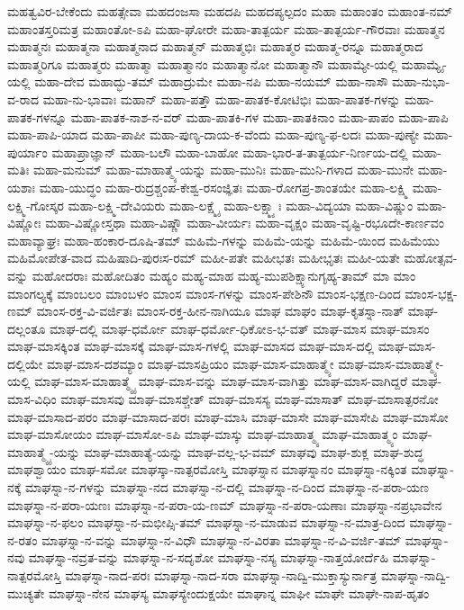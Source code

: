 {ಮಹತ್ವವಿರ-ಬೇಕೆಂದು
ಮಹತ್ಸೇವಾ
ಮಹದಂಜಸಾ
ಮಹದಪಿ
ಮಹದಪ್ಯಲ್ಪದಂ
ಮಹಾ
ಮಹಾಂತಂ
ಮಹಾಂತ-ನಮ್
ಮಹಾಂತಸ್ತರಿಮತ್ರ
ಮಹಾಂತೋ-ಽಪಿ
ಮಹಾ-ಘೋರೇ
ಮಹಾ-ತಾತ್ಪರ್ಯ
ಮಹಾ-ತಾತ್ಪರ್ಯ-ಗೌರವಾಃ
ಮಹಾತ್ಮನ
ಮಹಾತ್ಮನಃ
ಮಹಾತ್ಮನಾ
ಮಹಾತ್ಮನಾದ
ಮಹಾತ್ಮನ್
ಮಹಾತ್ಮಭಿಃ
ಮಹಾತ್ಮರ
ಮಹಾತ್ಮ-ರನ್ನೂ
ಮಹಾತ್ಮರಾದ
ಮಹಾತ್ಮರಿಗೂ
ಮಹಾತ್ಮರು
ಮಹಾತ್ಮಾ
ಮಹಾತ್ಮಾನಂ
ಮಹಾತ್ಮಾನೋ
ಮಹಾತ್ಮಾನೌ
ಮಹಾಮ್ಯೇ-ಯಲ್ಲಿ
ಮಹಾಮ್ಯೈ-ಯಲ್ಲಿ
ಮಹಾ-ದೇವ
ಮಹಾದ್ಭು-ತಮ್
ಮಹಾದ್ರುಮೇ
ಮಹಾ-ನಪಿ
ಮಹಾ-ನಯಮ್
ಮಹಾ-ನಾಸೌ
ಮಹಾ-ನುಭಾ-ವ-ರಾದ
ಮಹಾ-ನು-ಭಾವಾಃ
ಮಹಾನ್
ಮಹಾ-ಪತ್ತೌ
ಮಹಾ-ಪಾತಕ-ಕೋಟಿಭಿಃ
ಮಹಾ-ಪಾತಕ-ಗಳನ್ನು
ಮಹಾ-ಪಾತಕ-ಗಳನ್ನೂ
ಮಹಾ-ಪಾತಕ-ನಾಶ-ನ-ವರ್
ಮಹಾ-ಪಾತಕಿ-ಗಳ
ಮಹಾ-ಪಾತಕಿನಾಂ
ಮಹಾ-ಪಾಪಂ
ಮಹಾ-ಪಾಪಿ
ಮಹಾ-ಪಾಪಿ-ಯಾದ
ಮಹಾ-ಪಾಪೀ
ಮಹಾ-ಪುಣ್ಯ-ದಾಯ-ಕ-ವೆಂದು
ಮಹಾ-ಪುಣ್ಯ-ಫ-ಲದಃ
ಮಹಾ-ಪುಣ್ಯೇ
ಮಹಾ-ಪುರ್ಯಾಂ
ಮಹಾಪ್ರಾಜ್ಞಾನ್
ಮಹಾ-ಬಲೌ
ಮಹಾ-ಬಾಹೋ
ಮಹಾ-ಭಾರ-ತ-ತಾತ್ಪರ್ಯ-ನಿರ್ಣಯ-ದಲ್ಲಿ
ಮಹಾ-ಮತಿಃ
ಮಹಾ-ಮನುಮ್
ಮಹಾ-ಮಾಹಾತ್ಮ್ಯೆ-ಯನ್ನು
ಮಹಾ-ಮುನಿಃ
ಮಹಾ-ಮುನಿ-ಗಳಾದ
ಮಹಾ-ಮುನೇ
ಮಹಾ-ಯಶಾಃ
ಮಹಾ-ಯುದ್ಧಂ
ಮಹಾ-ರುದ್ರಶ್ಚಂಪ-ಕೇಶ್ವ-ರಸಂಜ್ಞಿತಃ
ಮಹಾ-ರೋಗಪ್ರ-ಶಾಂತಯೇ
ಮಹಾ-ಲಕ್ಷ್ಮಿ
ಮಹಾ-ಲಕ್ಷ್ಮಿ-ಗೋಸ್ಕರ
ಮಹಾ-ಲಕ್ಷ್ಮಿ-ದೇವಿಯರು
ಮಹಾ-ಲಕ್ಷ್ಮೈ
ಮಹಾ-ಲಕ್ಷ್ಮ್ಯಾಃ
ಮಹಾ-ವಿದ್ಯಯಾ
ಮಹಾ-ವಿಷ್ಣುಂ
ಮಹಾ-ವಿಷ್ಣೋಃ
ಮಹಾ-ವಿಷ್ಣೋಸ್ತಥಾ
ಮಹಾ-ವಿಷ್ಣೌ
ಮಹಾ-ವೀರ್ಯಃ
ಮಹಾ-ವೃಕ್ಷಂ
ಮಹಾ-ವೃಷ್ಟಿ-ರಭೂದೇ-ಕಾರ್ಣವಂ
ಮಹಾವ್ಯಾಘ್ರಃ
ಮಹಾ-ಹಂಕಾರ-ದೂಷಿ-ತಮ್
ಮಹಿಮೆ-ಗಳನ್ನು
ಮಹಿಮೆ-ಯನ್ನು
ಮಹಿಮೆ-ಯಿಂದ
ಮಹಿಮೆಯು
ಮಹಿಮೋಪೇತ-ವಾದ
ಮಹಿಷಾದಿ-ಪುರಃಸ-ರಮ್
ಮಹೀ-ಪತೇ
ಮಹೀಭತಃ
ಮಹೀಭೃತಃ
ಮಹೀ-ಯತೇ
ಮಹೋತ್ಸವ-ವನ್ನು
ಮಹೋದರಾಃ
ಮಹೋದಿತಂ
ಮಹ್ಯಂ
ಮಹ್ಯ-ಮಾಹ
ಮಹ್ಯ-ಮುಪಶಿಕ್ಷ್ಯಾನುಗೃಹ್ಯ-ತಾಮ್
ಮಾ
ಮಾಂ
ಮಾಂಗಲ್ಯಕ್ಕೆ
ಮಾಂಬಲಂ
ಮಾಂಬಳಂ
ಮಾಂಸ
ಮಾಂಸ-ಗಳನ್ನು
ಮಾಂಸ-ಪೇಶಿನೌ
ಮಾಂಸ-ಭಕ್ಷಣ-ದಿಂದ
ಮಾಂಸ-ಭಕ್ಷ-ಣಮ್
ಮಾಂಸ-ರಕ್ತ-ವಿ-ವರ್ಜಿತಃ
ಮಾಂಸ-ರಕ್ತ-ಹೀನ-ನಾಗಿಯೂ
ಮಾಘ
ಮಾಘಂ
ಮಾಘ-ಕೃತಸ್ನಾ-ನಾತ್
ಮಾಘ-ದಲ್ಲಂತೂ
ಮಾಘ-ದಲ್ಲಿ
ಮಾಘ-ಧರ್ಮೋ
ಮಾಘ-ಧರ್ಮೋ-ಧಿಕೋಽ-ಭ-ವತ್
ಮಾಘ-ಮಾಸ
ಮಾಘ-ಮಾಸಂ
ಮಾಘ-ಮಾಸಕ್ಕಿಂತ
ಮಾಘ-ಮಾಸಕ್ಕೆ
ಮಾಘ-ಮಾಸ-ಗಳಲ್ಲಿ
ಮಾಘ-ಮಾಸದ
ಮಾಘ-ಮಾಸ-ದಲ್ಲಿ
ಮಾಘ-ಮಾಸ-ದಲ್ಲಿಯೇ
ಮಾಘ-ಮಾಸ-ದಶಮ್ಯಾಂ
ಮಾಘ-ಮಾಸಪ್ರಿಯಂ
ಮಾಘ-ಮಾಸ-ಮಾಹಾತ್ಮ್ಯೇ
ಮಾಘ-ಮಾಸ-ಮಾಹಾತ್ಮ್ಯೇ-ಯಲ್ಲಿ
ಮಾಘ-ಮಾಸ-ಮಾಹಾತ್ಮ್ಯೈ
ಮಾಘ-ಮಾಸ-ವನ್ನು
ಮಾಘ-ಮಾಸ-ವಾಗಿತ್ತು
ಮಾಘ-ಮಾಸ-ವಾಗಿದ್ದರೆ
ಮಾಘ-ಮಾಸ-ವಿಧಿಂ
ಮಾಘ-ಮಾಸವು
ಮಾಘ-ಮಾಸಶ್ಚೇತ್
ಮಾಘ-ಮಾಸಸ್ಯ
ಮಾಘ-ಮಾಸಾತ್
ಮಾಘ-ಮಾಸಾತ್ಪರನೋ
ಮಾಘ-ಮಾಸಾದ-ಪರಂ
ಮಾಘ-ಮಾಸಾದ-ಪರಃ
ಮಾಘ-ಮಾಸಿ
ಮಾಘ-ಮಾಸೇ
ಮಾಘ-ಮಾಸೇಪಿ
ಮಾಘ-ಮಾಸೋ
ಮಾಘ-ಮಾಸೋಯಂ
ಮಾಘ-ಮಾಸೋ-ಽಪಿ
ಮಾಘ-ಮಾಸ್ಕು
ಮಾಘ-ಮಾಹಾತ್ಮ್ಯ
ಮಾಘ-ಮಾಹಾತ್ಮ್ಯಂ
ಮಾಘ-ಮಾಹಾತ್ಮ್ಯೈ-ಯನ್ನು
ಮಾಘ-ಮಾಹಾತ್ಯೆ-ಯನ್ನು
ಮಾಘ-ವಲ್ಲ-ಭ-ವಮ್
ಮಾಘವು
ಮಾಘ-ಶುಕ್ಲ
ಮಾಘ-ಶುದ್ಧ
ಮಾಘಶ್ವಾಯಂ
ಮಾಘ-ಸಮೋ
ಮಾಘಸ್ಕಾ-ನಾತ್ಪರಮೋಸ್ತಿ
ಮಾಘಸ್ನಾನ
ಮಾಘಸ್ನಾನಂ
ಮಾಘಸ್ನಾ-ನಕ್ಕಿಂತ
ಮಾಘಸ್ನಾ-ನಕ್ಕೆ
ಮಾಘಸ್ನಾ-ನ-ಗಳನ್ನು
ಮಾಘಸ್ನಾ-ನದ
ಮಾಘಸ್ನಾ-ನ-ದಲ್ಲಿ
ಮಾಘಸ್ನಾ-ನ-ದಿಂದ
ಮಾಘಸ್ನಾ-ನ-ಪರಾ-ಯಣ
ಮಾಘಸ್ನಾ-ನ-ಪರಾ-ಯಣಃ
ಮಾಘಸ್ನಾ-ನ-ಪರಾ-ಯ-ಣಮ್
ಮಾಘಸ್ನಾ-ನ-ಪರಾ-ಯಣಾಃ
ಮಾಘಸ್ನಾ-ನಪ್ರಭಾವೇನ
ಮಾಘಸ್ನಾ-ನ-ಫಲಂ
ಮಾಘಸ್ನಾ-ನ-ಮಭೀಪ್ಸಿ-ತಮ್
ಮಾಘಸ್ನಾ-ನ-ಮಾಡುವ
ಮಾಘಸ್ನಾ-ನ-ಮಾತ್ರ-ದಿಂದ
ಮಾಘಸ್ನಾ-ನ-ರತಂ
ಮಾಘಸ್ನಾ-ನ-ವನ್ನು
ಮಾಘಸ್ನಾ-ನ-ವಿಧೌ
ಮಾಘಸ್ನಾ-ನ-ವಿರತಾ
ಮಾಘಸ್ನಾ-ನ-ವಿ-ವರ್ಜಿ-ತಮ್
ಮಾಘಸ್ನಾ-ನವು
ಮಾಘಸ್ನಾ-ನವ್ರತ-ವನ್ನು
ಮಾಘಸ್ನಾ-ನ-ಸದೃಶೋ
ಮಾಘಸ್ನಾ-ನಸ್ಯ
ಮಾಘಸ್ನಾ-ನಾತ್ತಯೋರ್ದೆಹಿ
ಮಾಘಸ್ನಾ-ನಾತ್ಪರಮೋಸ್ತಿ
ಮಾಘಸ್ನಾ-ನಾದ-ಪರಃ
ಮಾಘಸ್ನಾ-ನಾದ-ಸರಾ
ಮಾಘಸ್ನಾ-ನಾದ್ವಿ-ಮುಕ್ತಾಸ್ಯುರ್ನಾತ್ರ
ಮಾಘಸ್ನಾ-ನಾದ್ವಿ-ಮುಚ್ಯತೇ
ಮಾಘಸ್ನಾ-ನೇನ
ಮಾಘಸ್ಯ
ಮಾಘಸ್ಯೇಂದುಕ್ಷಯೇ
ಮಾಘಾನ್ನ
ಮಾಘೀ
ಮಾಘೇ
ಮಾಘೇ-ನಾಪ-ಹೃತಂ
}

